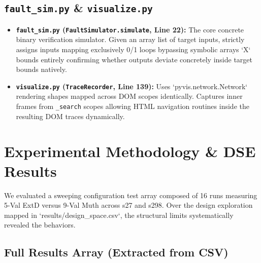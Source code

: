 \documentclass[12pt, a4paper]{article}
\begin{document}
\subsection{\texttt{fault\_sim.py} \& \texttt{visualize.py}}
\begin{itemize}
    \item \textbf{\texttt{fault\_sim.py} (\texttt{FaultSimulator.simulate}, Line 22):} The core concrete binary verification simulator. Given an array list of target inputs, strictly assigns inputs mapping exclusively 0/1 loops bypassing symbolic arrays `X` bounds entirely confirming whether outputs deviate concretely inside target bounds natively.
    \item \textbf{\texttt{visualize.py} (\texttt{TraceRecorder}, Line 139):} Uses `pyvis.network.Network` rendering shapes mapped across DOM scopes identically. Captures inner frames from \texttt{\_search} scopes allowing HTML navigation routines inside the resulting DOM traces dynamically.
\end{itemize}

\section{Experimental Methodology \& DSE Results}

We evaluated a sweeping configuration test array composed of 16 runs measuring 5-Val ExtD versus 9-Val Muth across s27 and s298. Over the design exploration mapped in `results/design_space.csv`, the structural limits systematically revealed the behaviors.

\subsection{Full Results Array (Extracted from CSV)}

\begin{table}[H]
\centering
\caption{Key Comparative Array (frames=8 limits=10/50)}
\end{table}
\end{document}
